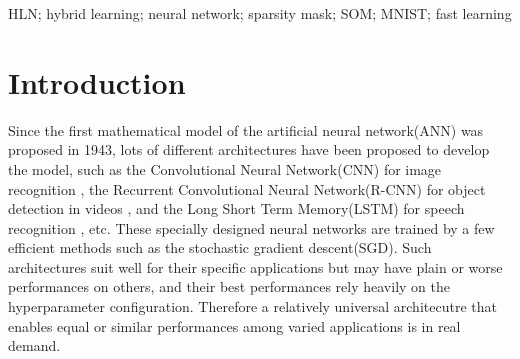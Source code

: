 \documentclass[3p,times,procedia]{elsarticle}
\begin{document}
\begin{frontmatter}
\begin{keyword}
HLN; hybrid learning; neural network; sparsity mask; SOM; MNIST; fast learning




\end{keyword}

\end{frontmatter}



\section{Introduction}
\label{main}
Since the first mathematical model 
of the artificial neural network(ANN) was 
proposed in 
1943\cite{mcculloch1943logical}, 
lots of different architectures 
have been proposed
to develop the model, such as 
the Convolutional Neural Network(CNN) 
for image recognition
\cite{krizhevsky2012imagenet}, 
the Recurrent Convolutional Neural 
Network(R-CNN) for object 
detection in videos
\cite{girshick2015fast}, 
and the Long Short Term Memory(LSTM)
for speech recognition
\cite{graves2013hybrid}, etc. 
These specially designed neural 
networks are trained by 
a few efficient methods such as
the stochastic gradient 
descent(SGD)\cite{bottou2010large}. 
Such architectures
suit well for their specific 
applications but may have plain 
or worse performances on others, 
and their best performances 
rely heavily on the hyperparameter 
configuration. Therefore
a relatively universal 
architecutre that enables equal 
or similar performances among 
varied applications is in real demand.
\end{document}
